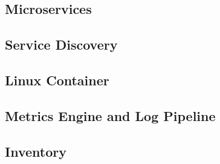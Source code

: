 \subsection{Microservices}



\subsection{Service Discovery}


\subsection{Linux Container}



\subsection{Metrics Engine and Log Pipeline}




\subsection{Inventory}

